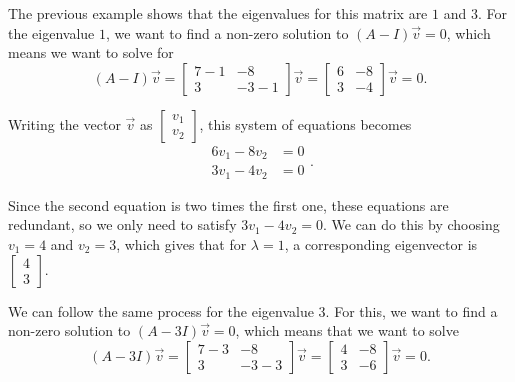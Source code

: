 \documentclass{ximera}
\begin{document}
\begin{exampleSol}
    The previous example shows that the eigenvalues for this matrix are $1$ and $3$. For the eigenvalue $1$, we want to find a non-zero solution to $(A - I)\vec{v} = 0$, which means we want to solve for
    \[ 
        (A - I)\vec{v} = 
        \begin{bmatrix} 
            7-1 & -8 \\ 
            3 & -3-1 
        \end{bmatrix}
        \vec{v} = 
        \begin{bmatrix} 
            6 & -8 \\ 
            3 & -4 
        \end{bmatrix}\vec{v}= 0. 
    \]
    
    Writing the vector $\vec{v}$ as $\begin{bmatrix} v_1 \\ v_2 \end{bmatrix}$, this system of equations becomes
    \begin{equation*} 
        \begin{split}
            6v_1 - 8v_2 &= 0 \\
            3v_1 - 4v_2 &= 0
        \end{split}.
    \end{equation*}
    
    Since the second equation is two times the first one, these equations are redundant, so we only need to satisfy $3v_1 - 4v_2 = 0$. We can do this by choosing $v_1 = 4$ and $v_2 = 3$, which gives that for $\lambda = 1$, a corresponding eigenvector is $\begin{bmatrix} 4 \\ 3 \end{bmatrix}$. 
    
    We can follow the same process for the eigenvalue $3$. For this, we want to find a non-zero solution to $(A - 3I)\vec{v} = 0$, which means that we want to solve 
    \begin{equation*} 
        (A - 3I)\vec{v} = 
        \begin{bmatrix} 
            7-3 & -8 \\ 
            3 & -3-3 
        \end{bmatrix}
        \vec{v} = 
        \begin{bmatrix} 
            4 & -8 \\ 
            3 & -6 
        \end{bmatrix}
        \vec{v}= 0. 
    \end{equation*}
    

\end{exampleSol}
\end{document}
